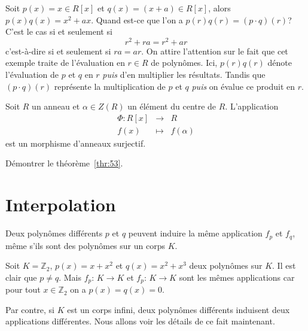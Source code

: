 \begin{example}
  \label{exe:43}
  Soit $p(x) = x ∈ R[x]$ et $q(x) = (x + a) ∈ R[x]$, alors $p(x) q(x) = x^2 + ax$. Quand est-ce que l'on a $p(r) q(r) = (p ⋅q)(r)$? C'est le cas si et seulement si
  \begin{displaymath}
     r^2 + r a = r^2 + a r  
   \end{displaymath}
   c'est-à-dire si et seulement si $ra = ar$. 
   On attire l'attention sur le fait que cet exemple traite de l'évaluation en $r \in R$ de polynômes. 
   Ici, $p(r)q(r)$ dénote l'évaluation de $p$ et $q$ en $r$ \emph{puis} d'en multiplier les résultats.
   Tandis que $(p⋅q)(r)$ représente la multiplication de $p$ et $q$ \emph{puis} on évalue ce produit en $r$.
\end{example}


\begin{theorem}
  \label{thr:53}
  Soit $R$ un anneau et $\alpha \in Z(R)$ un élément du centre de $R$. L'application 
  \begin{displaymath}   
    \begin{array}{rcl}
    \Phi \colon R[x] &\rightarrow & R \\
           f(x) &\mapsto &f(\alpha)          
    \end{array}
  \end{displaymath}
est un morphisme d'anneaux surjectif. 
\end{theorem}


\begin{exercise}
  \label{exe:44}
  Démontrer le théorème~\ref{thr:53}. 
\end{exercise}


\section{Interpolation}
\label{sec:interpolation}


Deux polynômes différents $p$ et $q$ peuvent induire la même application $f_p$ et $f_q$, même s'ils sont des polynômes sur un corps $K$.

\begin{example}
  \label{exe:36}
  Soit $K = ℤ_2$, $p(x) = x + x^2 $ et $q(x) = x^2 + x^3$ deux
  polynômes sur $K$. Il est clair que $p ≠ q$. Mais $f_p:\, K →K$ et
  $f_p:\, K →K$ sont les mêmes applications car pour tout
  $x ∈ℤ_2$ on a $p(x) = q(x) = 0$.
\end{example}

Par contre, si $K$ est un corps infini, deux polynômes différents induisent deux applications différentes. Nous allons voir les détails de ce fait maintenant.

